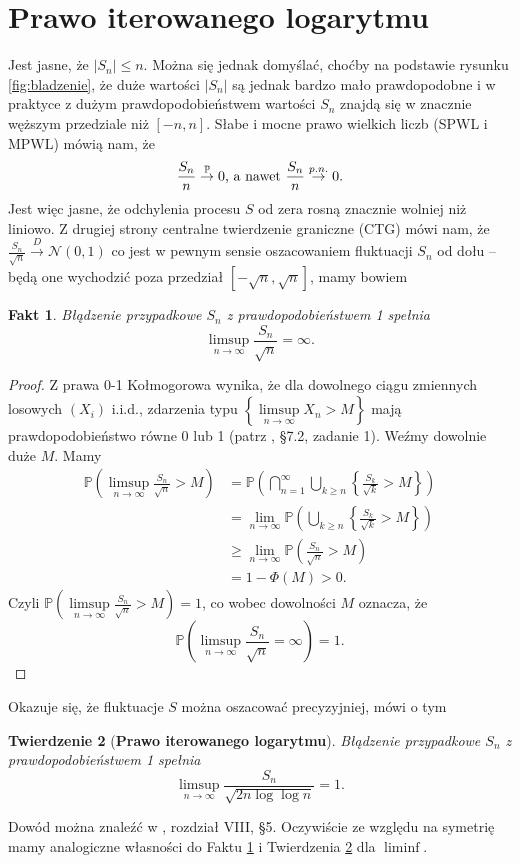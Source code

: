 \documentclass[a4paper,11pt,twoside]{book}
\newcommand{\Prob}{\mathbb{P}}
\newcommand{\conv}{\rightarrow}
\newcommand{\norm}[2]{\mathcal{N}\left(#1, #2\right)}
\newtheorem{twier}{Twierdzenie}[chapter]
\newtheorem{fakt}[twier]{Fakt}
\theoremstyle{definition}
\begin{document}
\section{Prawo iterowanego logarytmu}
Jest jasne, że $|S_n| \leq n$. Można się jednak domyślać, choćby na podstawie rysunku \ref{fig:bladzenie}, że duże wartości $|S_n|$ są jednak bardzo mało prawdopodobne i w praktyce z dużym prawdopodobieństwem wartości $S_n$ znajdą się w znacznie węższym przedziale niż $[-n, n]$. Słabe i mocne prawo wielkich liczb (SPWL i MPWL) mówią nam, że
\[\frac{S_n}{n} \stackrel{\Prob}{\rightarrow} 0 \hbox{, a nawet } \frac{S_n}{n} \stackrel{p.n.}{\rightarrow} 0.\] Jest więc jasne, że odchylenia procesu $S$ od zera rosną znacznie wolniej niż liniowo. Z drugiej strony centralne twierdzenie graniczne (CTG) mówi nam, że $\frac{S_n}{\sqrt{n}} \stackrel{D}{\rightarrow} \norm{0}{1}$
co jest w pewnym sensie oszacowaniem fluktuacji $S_n$ od dołu -- będą one wychodzić poza przedział $[-\sqrt{n}, \sqrt{n}]$, mamy bowiem
\begin{fakt}
\label{fakt:bladzenie_clt}
 Błądzenie przypadkowe $S_n$  z prawdopodobieństwem 1 spełnia \[ \limsup_{n \conv \infty} \frac{S_n}{\sqrt{n}} = \infty. \]
\end{fakt}
\begin{proof}
 Z prawa 0-1 Kołmogorowa wynika, że dla dowolnego ciągu zmiennych losowych $(X_i)$ i.i.d., zdarzenia typu $\left\{ \limsup\limits_{n \conv \infty} X_n > M \right\}$ mają prawdopodobieństwo równe 0 lub 1 (patrz \cite{jak-szt}, \S7.2, zadanie 1). Weźmy dowolnie duże $M$. Mamy
 \begin{align*}
  \Prob\left(\limsup_{n \conv \infty} \frac{S_n}{\sqrt{n}} > M \right)
  &= \Prob\left(\bigcap_{n=1}^\infty \bigcup_{k \geq n} \left\{ \frac{S_k}{\sqrt{k}} > M \right\} \right)\\
  &= \lim_{n \conv \infty} \Prob\left( \bigcup_{k \geq n} \left\{ \frac{S_k}{\sqrt{k}} > M \right\} \right) \\
  &\geq \lim_{n \conv \infty} \Prob\left(\frac{S_n}{\sqrt{n}} > M \right) \\
  &= 1 - \Phi(M) > 0.
 \end{align*}
 Czyli $\Prob\left(\limsup\limits_{n \conv \infty} \frac{S_n}{\sqrt{n}} > M \right) = 1$, co wobec dowolności $M$ oznacza, że \[ \Prob\left(\limsup_{n \conv \infty} \frac{S_n}{\sqrt{n}} = \infty \right) = 1. \]
\end{proof}

Okazuje się, że fluktuacje $S$ można oszacować precyzyjniej, mówi o tym
\begin{twier}[\textbf{Prawo iterowanego logarytmu}]
\label{tw:pil}
 Błądzenie przypadkowe $S_n$  z prawdopodobieństwem 1 spełnia \[ \limsup_{n \conv \infty} \frac{S_n}{ \sqrt{2 n \log \log n} } = 1. \]
\end{twier}
\noindent Dowód można znaleźć w \cite{feller}, rozdział VIII, \S5. Oczywiście ze względu na symetrię mamy analogiczne własności do Faktu \ref{fakt:bladzenie_clt} i Twierdzenia \ref{tw:pil} dla $\liminf$.
\end{document}
